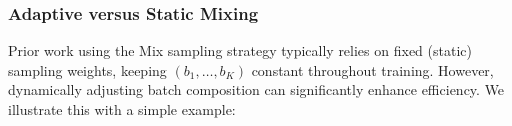 %
%
%

%
%
%
%
%

%
%
%
%
%

%
%
%
%

%








%
%

%

%

%

%

%

%
%
%
%
%
%
%
%


%

%

%

%

%

%

%
%


\subsubsection{Adaptive versus Static Mixing}  

Prior work using the Mix sampling strategy typically relies on fixed (static) sampling weights, keeping $(b_1, \ldots, b_K)$ constant throughout training. However, dynamically adjusting batch composition can significantly enhance efficiency. We illustrate this with a simple example:

